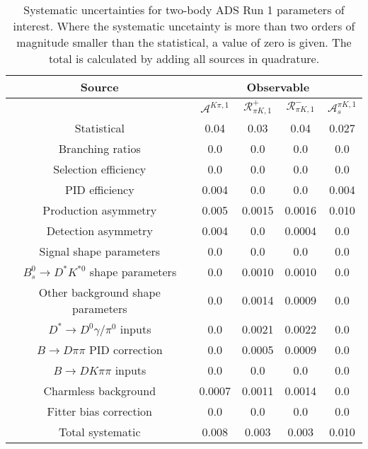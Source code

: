\begin{sidewaystable}
  \centering
  \begin{tabular}{ccccc}
      \toprule
      Source & \multicolumn{4}{c}{Observable} \\
      \midrule
       & $\mathcal{A}^{K\pi,1}$ & $\mathcal{R}_{\pi K,1}^+$ & $\mathcal{R}_{\pi K,1}^-$ & $\mathcal{A}_s^{\pi K,1}$ \\
      \midrule
      Statistical & 0.04 & 0.03 & 0.04 & 0.027 \\
      \midrule
      Branching ratios & 0.0  & 0.0  & 0.0  & 0.0  \\
      Selection efficiency & 0.0  & 0.0  & 0.0  & 0.0  \\
      PID efficiency & 0.004 & 0.0  & 0.0  & 0.004 \\
      Production asymmetry & 0.005 & 0.0015 & 0.0016 & 0.010 \\
      Detection asymmetry & 0.004 & 0.0  & 0.0004 & 0.0  \\
      Signal shape parameters & 0.0  & 0.0  & 0.0  & 0.0  \\
      $B^0_s \to D^* K^{*0}$ shape parameters & 0.0  & 0.0010 & 0.0010 & 0.0  \\
      Other background shape parameters & 0.0  & 0.0014 & 0.0009 & 0.0  \\
      $D^* \to D^0 \gamma/\pi^0$ inputs & 0.0  & 0.0021 & 0.0022 & 0.0  \\
      $B\to D\pi\pi$ PID correction & 0.0  & 0.0005 & 0.0009 & 0.0  \\
      $B\to DK\pi\pi$ inputs & 0.0  & 0.0  & 0.0  & 0.0  \\
      Charmless background & 0.0007 & 0.0011 & 0.0014 & 0.0  \\
      Fitter bias correction & 0.0  & 0.0  & 0.0  & 0.0  \\
      \midrule
      Total systematic & 0.008 & 0.003 & 0.003 & 0.010 \\
      \bottomrule
  \end{tabular}
  \caption{Systematic uncertainties for two-body ADS Run 1 parameters of interest. Where the systematic uncetainty is more than two orders of magnitude smaller than the statistical, a value of zero is given. The total is calculated by adding all sources in quadrature.}
\label{tab:twoBody_ADS_run1_systematics}
\end{sidewaystable}
